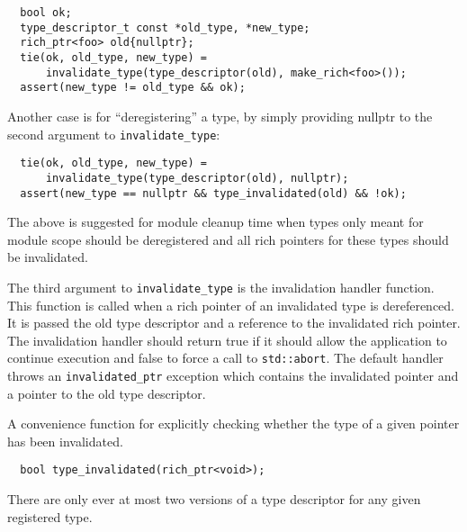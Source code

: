 \begin{verbatim}
  bool ok;
  type_descriptor_t const *old_type, *new_type;
  rich_ptr<foo> old{nullptr};
  tie(ok, old_type, new_type) =
      invalidate_type(type_descriptor(old), make_rich<foo>());
  assert(new_type != old_type && ok);
\end{verbatim}

Another case is for ``deregistering'' a type, by simply providing nullptr to the
second argument to \verb+invalidate_type+:

\begin{verbatim}
  tie(ok, old_type, new_type) =
      invalidate_type(type_descriptor(old), nullptr);
  assert(new_type == nullptr && type_invalidated(old) && !ok);
\end{verbatim}

The above is suggested for module cleanup time when types only meant for module
scope should be deregistered and all rich pointers for these types should be
invalidated.

The third argument to \verb+invalidate_type+ is the invalidation handler
function. This function is called when a rich pointer of an invalidated type is
dereferenced. It is passed the old type descriptor and a reference to the
invalidated rich pointer.  The invalidation handler should return true if it
should allow the application to continue execution and false to force a call to
\verb+std::abort+. The default handler throws an \verb+invalidated_ptr+
exception which contains the invalidated pointer and a pointer to the old type
descriptor.

A convenience function for explicitly checking whether the type of a given
pointer has been invalidated.

\begin{verbatim}
  bool type_invalidated(rich_ptr<void>);
\end{verbatim}

There are only ever at most two versions of a type descriptor for any given
registered type.


